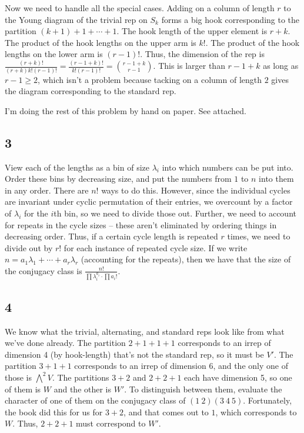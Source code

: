 \documentclass{article}
\begin{document}
Now we need to handle all the special cases. Adding on a column of length $r$ to the Young diagram of the trivial rep on $S_k$ forms a big hook corresponding to the partition $(k+1)+1+\cdots+1$. The hook length of the upper element is $r+k$. The product of the hook lengths on the upper arm is $k!$. The product of the hook lengths on the lower arm is $(r-1)!$. Thus, the dimension of the rep is $\frac{(r+k)!}{(r+k)k!(r-1)!}=\frac{(r-1+k)!}{k!(r-1)!}=\binom{r-1+k}{r-1}$. This is larger than $r-1+k$ as long as $r-1\geq2$, which isn't a problem because tacking on a column of length $2$ gives the diagram corresponding to the standard rep.

I'm doing the rest of this problem by hand on paper. See attached. 
\subsection*{3}
View each of the lengths as a bin of size $\lambda_i$ into which numbers can be put into. Order these bins by decreasing size, and put the numbers from $1$ to $n$ into them in any order. There are $n!$ ways to do this. However, since the individual cycles are invariant under cyclic permutation of their entries, we overcount by a factor of $\lambda_i$ for the $i$th bin, so we need to divide those out. Further, we need to account for repeats in the cycle sizes -- these aren't eliminated by ordering things in decreasing order. Thus, if a certain cycle length is repeated $r$ times, we need to divide out by $r!$ for each instance of repeated cycle size. If we write $n=a_1\lambda_1+\cdots+a_r\lambda_r$ (accounting for the repeats), then we have that the size of the conjugacy class is $\frac{n!}{\prod\lambda_i^{a_i}\cdot\prod a_i!}$.
\subsection*{4}
We know what the trivial, alternating, and standard reps look like from what we've done already. The partition $2+1+1+1$ corresponds to an irrep of dimension 4 (by hook-length) that's not the standard rep, so it must be $V'$. The partition $3+1+1$ corresponds to an irrep of dimension 6, and the only one of those is $\bigwedge^2 V$. The partitions $3+2$ and $2+2+1$ each have dimension 5, so one of them is $W$ and the other is $W'$. To distinguish between them, evaluate the character of one of them on the conjugacy class of $(1\ 2)(3\ 4\ 5)$. Fortunately, the book did this for us for $3+2$, and that comes out to $1$, which corresponds to $W$. Thus, $2+2+1$ must correspond to $W'$.
\end{document}
